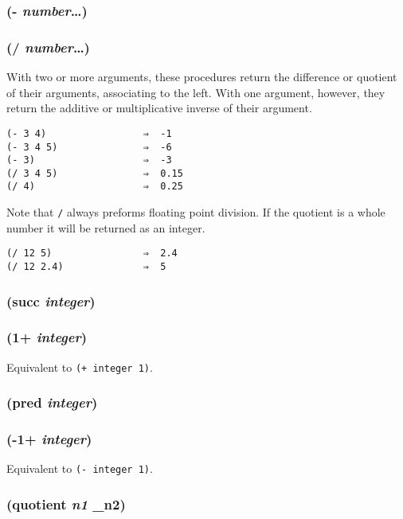 \documentclass{article}
\begin{document}
\subsubsection{(- \emph{number}\ldots{})}

\subsubsection{(/ \emph{number}\ldots{})}

With two or more arguments, these procedures return the difference or quotient of their
arguments, associating to the left. With one argument, however, they return the additive or
multiplicative inverse of their argument.

\begin{verbatim}
(- 3 4)                 ⇒  -1
(- 3 4 5)               ⇒  -6
(- 3)                   ⇒  -3
(/ 3 4 5)               ⇒  0.15
(/ 4)                   ⇒  0.25
\end{verbatim}

Note that \verb|/| always preforms floating point division. If the quotient is a whole
number it will be returned as an integer.

\begin{verbatim}
(/ 12 5)                ⇒  2.4
(/ 12 2.4)              ⇒  5
\end{verbatim}

\subsubsection{(succ \emph{integer})}

\subsubsection{(1+ \emph{integer})}

Equivalent to \verb|(+ integer 1)|.

\subsubsection{(pred \emph{integer})}

\subsubsection{(-1+ \emph{integer})}

Equivalent to \verb|(- integer 1)|.

\subsubsection{(quotient \emph{n1} \_n2)}
\end{document}
